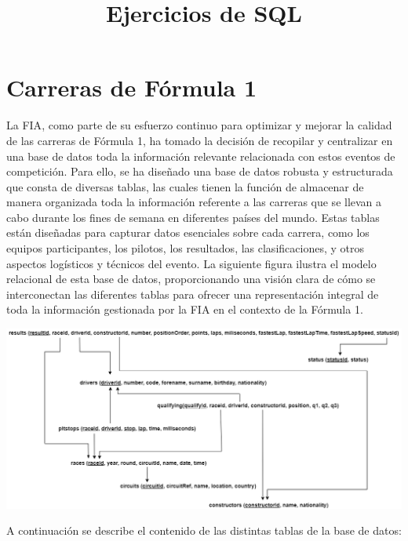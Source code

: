 \documentclass{db-practice}
\title{Ejercicios de SQL}
\begin{document}
\maketitle

\section{Carreras de Fórmula 1}

La \ac{FIA}, como parte de su esfuerzo continuo para optimizar y mejorar la calidad de las carreras de Fórmula 1, ha tomado la decisión de recopilar y centralizar en una base de datos toda la información relevante relacionada con estos eventos de competición. Para ello, se ha diseñado una base de datos robusta y estructurada que consta de diversas tablas, las cuales tienen la función de almacenar de manera organizada toda la información referente a las carreras que se llevan a cabo durante los fines de semana en diferentes países del mundo. Estas tablas están diseñadas para capturar datos esenciales sobre cada carrera, como los equipos participantes, los pilotos, los resultados, las clasificaciones, y otros aspectos logísticos y técnicos del evento. La siguiente figura ilustra el modelo relacional de esta base de datos, proporcionando una visión clara de cómo se interconectan las diferentes tablas para ofrecer una representación integral de toda la información gestionada por la \ac{FIA} en el contexto de la Fórmula 1.

\includegraphics[width=\textwidth]{figs/sql/f1-modelo-relacional}

A continuación se describe el contenido de las distintas tablas de la base de datos:
\end{document}
